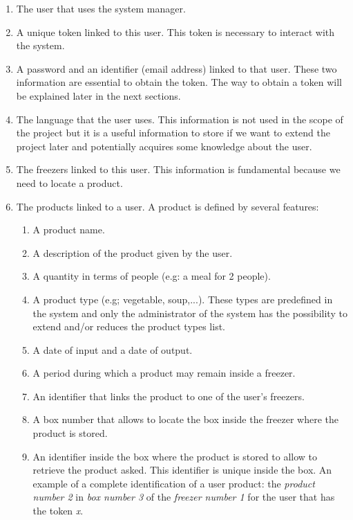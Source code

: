 \begin{enumerate}
\item The user that uses the system manager.
\item A unique token linked to this user. This token is necessary to interact with the system.
\item A password and an identifier (email address) linked to that user. These two information are essential to obtain the token. The way to obtain a token will be explained later in the next sections.
\item The language that the user uses. This information is not used in the scope of the project but it is a useful information to store if we want to extend the project later and potentially acquires some knowledge about the user.
\item The freezers linked to this user. This information is fundamental because we need to locate a product.
\item The products linked to a user. A product is defined by several features: 
\begin{enumerate}
\item A product name.
\item A description of the product given by the user.
\item A quantity in terms of people (e.g: a meal for 2 people).
\item A product type (e.g; vegetable, soup,...). These types are predefined in the system and only the administrator of the system has the possibility to extend and/or reduces the product types list.
\item A date of input and a date of output.
\item A period during which a product may remain inside a freezer.
\item An identifier that links the product to one of the user's freezers.
\item A box number that allows to locate the box inside the freezer where the  product is stored.
\item An identifier inside the box where the product is stored to allow to retrieve the product asked. This identifier is unique inside the box. An example of a complete identification of a user product: the \textit{product number 2} in \textit{box number 3} of the \textit{freezer number 1} for the user that has the token \textit{x}.
\end{enumerate}
\end{enumerate}


